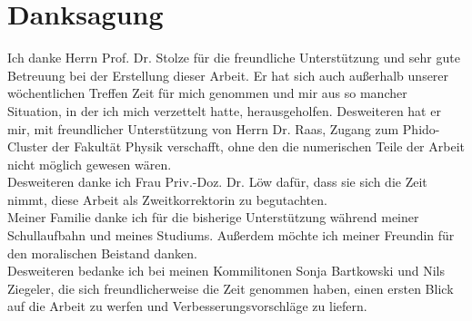 \chapter*{Danksagung}
Ich danke Herrn Prof. Dr. Stolze für die freundliche Unterstützung und sehr gute Betreuung bei der Erstellung dieser Arbeit. Er hat sich auch außerhalb unserer wöchentlichen Treffen Zeit für mich genommen und mir aus so mancher Situation, in der ich mich verzettelt hatte, herausgeholfen. Desweiteren hat er mir, mit freundlicher Unterstützung von Herrn Dr. Raas, Zugang zum Phido-Cluster der Fakultät Physik verschafft, ohne den die numerischen Teile der Arbeit nicht möglich gewesen wären.\\
Desweiteren danke ich Frau Priv.-Doz. Dr. Löw dafür, dass sie sich die Zeit nimmt, diese Arbeit als Zweitkorrektorin zu begutachten. \\
Meiner Familie danke ich für die bisherige Unterstützung während meiner Schullaufbahn und meines Studiums. Außerdem möchte ich meiner Freundin für den moralischen Beistand danken. \\
Desweiteren bedanke ich bei meinen Kommilitonen Sonja Bartkowski und Nils Ziegeler, die sich freundlicherweise die Zeit genommen haben, einen ersten Blick auf die Arbeit zu werfen und Verbesserungsvorschläge zu liefern.
\thispagestyle{empty}
